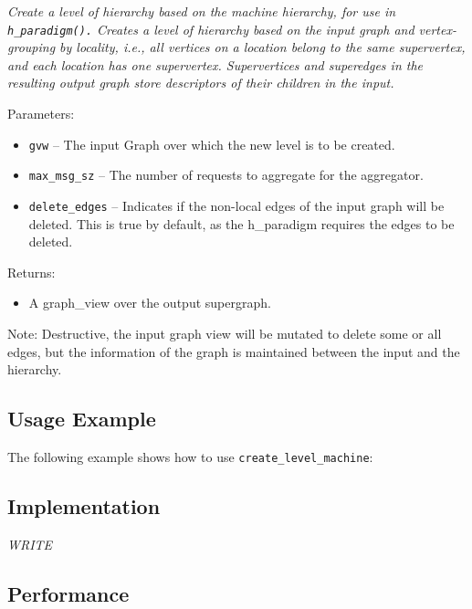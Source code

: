 \textit{
Create a level of hierarchy based on the machine hierarchy, for use in 
\texttt{h\_paradigm().}%
Creates a level of hierarchy based on the input graph and vertex-grouping by locality, i.e., all vertices on a location belong to the same supervertex, and each location has one supervertex. 
Supervertices and superedges in the resulting output graph store descriptors of their children in the input.
}
\vspace{0.4cm}

Parameters:
\begin{itemize}
\item
\texttt{gvw} --
The input Graph over which the new level is to be created.
\item
\texttt{max\_msg\_sz} --
The number of requests to aggregate for the aggregator.
\item
\texttt{delete\_edges} --
Indicates if the non-local edges of the input graph will be deleted. This is true by default, as the h\_paradigm requires the edges to be deleted.
\end{itemize}

Returns:
\begin{itemize}
\item
A graph\_view over the output supergraph. 
\end{itemize}

Note:
Destructive, the input graph view will be mutated to delete some or all edges, but the information of the graph is maintained between the input and the hierarchy. 

\subsection{Usage Example} \label{sec-create-level-mach-alg-use}

The following example shows how to use 
\texttt{create\_level\_machine}:


\subsection{Implementation} \label{sec-create-level-mach-alg-impl}

\textit{WRITE}

\subsection{Performance} \label{sec-create-level-mach-alg-perf}

